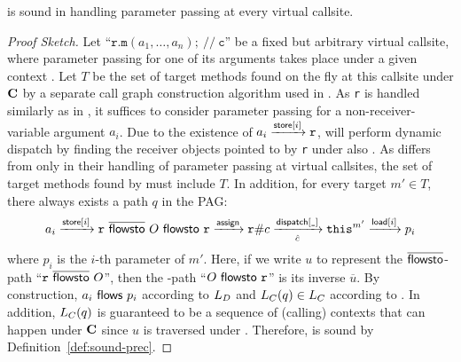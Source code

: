 \begin{lem}
\label{thm:lfc-imprecise}
\LFC is sound  in handling parameter passing at every virtual
callsite.
\end{lem}
\begin{proof}[Proof Sketch]
Let 
``$\mathtt{r}.\mathtt{m}(a_1, \dots, a_n); ~ // ~ \mathtt{c}$''
be  a fixed but arbitrary virtual callsite, where parameter passing for
one of its arguments takes place under a given context \CC. Let $T$ be the set of
target methods found on the fly at this callsite under $\textbf{C}$ by a separate call graph
construction algorithm used in \manuLFC. As \texttt{r} is handled
similarly as in \manuLFC, it suffices to consider parameter passing for a non-receiver-variable argument
$a_i$. Due to the existence of $a_i \xrightarrow{\textsf{store}[i]} \mathtt{r}$, \LFC will perform dynamic dispatch by finding the receiver
objects pointed to by \texttt{r} under also  \CC.
As \LFC differs from \manuLFC only in their handling of parameter passing 
at virtual callsites, the set of target methods found by \LFC must include
$T$. In addition, for every target  $m' \in T$, there  always exists
a path $q$ in the PAG:
\begin{equation}
    \label{eq:proof-valid-DP}
a_i \xrightarrow{\textsf{store}[i]} \mathtt{r} ~
\overline{\textsf{flowsto}} ~ O ~ \textsf{flowsto} ~\mathtt{r}
 \xrightarrow{\textsf{assign}} \mathtt{r}\#c
 \xrightarrow[\hat{c}]{\textsf{dispatch}[\texttt{\_}]}\texttt{this}^{m'}
 \xrightarrow{\textsf{load}[i]} p_i 
 \end{equation}
 where $p_i$ is the $i$-th parameter of $m'$.
 Here, if we write $u$ to represent the $\overline{\textsf{flowsto}}$-path ``$\mathtt{r} ~
\overline{\textsf{flowsto}} ~ O$'', then the \flows-path ``$O ~ \textsf{flowsto} ~\mathtt{r}$'' is its
inverse $\overline{u}$. By construction, $a_i ~\textsf{flows}~ p_i$ according to $\mbox{${L}_D$}$ and
$\mbox{${L}_C$}(q) \in \mbox{${L}_C$}$ according to \LC. In addition,
$\mbox{${L}_C$}(q)$ is guaranteed to be a sequence of (calling) contexts that can happen
under $\textbf{C}$ since $u$ is traversed under \CC. Therefore, \LFC is sound by Definition~\ref{def:sound-prec}.
\begin{comment}
In terms of their PAGs used, 
\LFCR differs from \manuLFCDD (i.e., \manuLFC) only in how virtual callsites are handled.
Given a program, its PAG  used by \LFC (\Cref{fig:newcflpag}), together with
\LF, ensures that for every virtual callsite $\mathtt{x} = \mathtt{r}.\mathtt{m}(a_1, \dots, a_n)$,
there always exists an \LFC-path from its arguments (return variable) to their
parameters ($\mathtt{x}$) for all possible  methods invoked at the callsite. Let
$\pointsto^{\manuLFCDD}(v,c_v)$ be computed by \manuLFCDD. By  applying
Lemma~\ref{theorem:handlingReceiver} further 
and noting the definition of \manuLFCDD (stated at the beginning of \Cref{sec:CFL}), we obtain
$\pointsto(v,c_v) \supseteq \pointsto^{\manuLFCDD}(v,c_v)$, where $\supseteq$ can be
strict, i.e., $\supset$.
\end{comment}
\end{proof}


